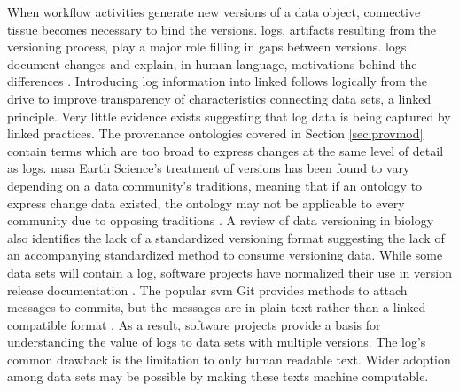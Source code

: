 When workflow activities generate new \glspl{version} of a data object, connective tissue becomes necessary to bind the \glspl{version}.
\Glspl{log}, artifacts resulting from the versioning process, play a major role filling in gaps between versions.
\Glspl{log} document changes and explain, in human language, motivations behind the differences \cite{uel1037}.
Introducing \gls{log} information into \gls{linked} follows logically from the drive to improve transparency of characteristics connecting data sets, a \gls{linked} principle.
Very little evidence exists suggesting that \gls{log} data is being captured by \gls{linked} practices.
The provenance ontologies covered in Section \ref{sec:provmod} contain terms which are too broad to express changes at the same level of detail as \glspl{log}.
\gls{nasa} Earth Science's treatment of versions has been found to vary depending on a data community's traditions, meaning that if an ontology to express change data existed, the ontology may not be applicable to every community due to opposing traditions \cite{barkstrom2014earth}.
A review of data versioning in biology also identifies the lack of a standardized versioning format suggesting the lack of an accompanying standardized method to consume versioning data.
While some data sets will contain a \gls{log}, software projects have normalized their use in version release documentation \cite{German03automatingthe}.
The popular \gls{svm} Git provides methods to attach messages to commits, but the messages are in plain-text rather than a \gls{linked} compatible format \cite{Chacon:2009:PG:1618548}.
As a result, software projects provide a basis for understanding the value of \glspl{log} to data sets with multiple \glspl{version}.
The \gls{log}'s common drawback is the limitation to only human readable text.
Wider adoption among data sets may be possible by making these texts machine computable.

